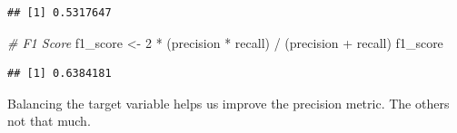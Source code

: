 \documentclass[
  twoside]{article}
\newenvironment{Shaded}{\begin{snugshade}}{\end{snugshade}}
\newcommand{\CommentTok}[1]{\textcolor[rgb]{0.56,0.35,0.01}{\textit{#1}}}
\newcommand{\DecValTok}[1]{\textcolor[rgb]{0.00,0.00,0.81}{#1}}
\newcommand{\NormalTok}[1]{#1}
\newcommand{\OtherTok}[1]{\textcolor[rgb]{0.56,0.35,0.01}{#1}}
\newcommand{\SpecialCharTok}[1]{\textcolor[rgb]{0.00,0.00,0.00}{#1}}
\begin{document}
\begin{verbatim}
## [1] 0.5317647
\end{verbatim}

\begin{Shaded}
\begin{Highlighting}[]
\CommentTok{\# F1 Score}
\NormalTok{f1\_score }\OtherTok{\textless{}{-}} \DecValTok{2} \SpecialCharTok{*}\NormalTok{ (precision }\SpecialCharTok{*}\NormalTok{ recall) }\SpecialCharTok{/}\NormalTok{ (precision }\SpecialCharTok{+}\NormalTok{ recall)}
\NormalTok{f1\_score}
\end{Highlighting}
\end{Shaded}

\begin{verbatim}
## [1] 0.6384181
\end{verbatim}

Balancing the target variable helps us improve the precision metric. The
others not that much.
\end{document}
